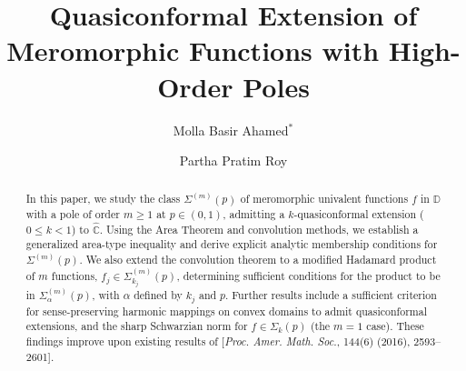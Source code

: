 \documentclass[a4paper,12pt]{amsart}
\theoremstyle{plain}
\theoremstyle{definition}
\newcounter{minutes}\setcounter{minutes}{\time}
\newcounter{hours}\setcounter{hours}{\time}
\begin{document}
\title{Quasiconformal Extension of Meromorphic Functions with High-Order Poles}

\author{Molla Basir Ahamed$^*$}
\address{Molla Basir Ahamed, Department of Mathematics, Jadavpur University, Kolkata-700032, West Bengal, India.}

\author{Partha Pratim Roy}
\address{Partha Pratim Roy, Department of Mathematics, Jadavpur University, Kolkata-700032, West Bengal,India.}



\def\thefootnote{}
 \makeatletter\def\thefootnote{\@arabic\c@footnote}\makeatother

\begin{abstract} 
In this paper, we study the class ${\Sigma^{(m)}(p)}$ of meromorphic univalent functions $f$ in $\mathbb{D}$ with a pole of order ${m \geq 1}$ at $p \in (0,1)$, admitting a $k$-quasiconformal extension ($0 \leq k < 1$) to $\widehat{\mathbb{C}}$. Using the Area Theorem and convolution methods, we establish a generalized area-type inequality and derive explicit analytic membership conditions for $\Sigma^{(m)}(p)$. We also extend the convolution theorem to a modified Hadamard product of $m$ functions, $f_j \in \Sigma^{(m)}_{k_j}(p)$, determining sufficient conditions for the product to be in ${\Sigma^{(m)}_{\alpha}(p)}$, with $\alpha$ defined by $k_j$ and $p$. Further results include a sufficient criterion for sense-preserving harmonic mappings on convex domains to admit quasiconformal extensions, and the sharp Schwarzian norm for $f \in \Sigma_k(p)$ (the $m=1$ case). These findings improve upon existing results of [{\em Proc. Amer. Math. Soc.}, {144}(6) (2016), 2593--2601].
\end{abstract}
\maketitle
\pagestyle{myheadings}
\end{document}
